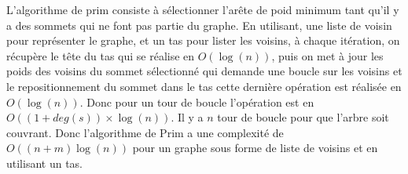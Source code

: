 L'algorithme de prim consiste à sélectionner l'arête de poid minimum tant qu'il y a des sommets qui ne font pas partie du graphe. En utilisant, une liste de voisin pour représenter le graphe, et un tas pour lister les voisins, à chaque itération, on récupère le tête du tas qui se réalise en $O(\log(n))$, puis on met à jour les poids des voisins du sommet sélectionné qui demande une boucle sur les voisins et le repositionnement du sommet dans le tas cette dernière opération est réalisée en $O(\log(n))$. Donc pour un tour de boucle l'opération est en $O((1 + deg(s))\times\log(n))$. Il y a $n$ tour de boucle pour que l'arbre soit couvrant. Donc l'algorithme de Prim a une complexité de $O((n+m) \log(n))$ pour un graphe sous forme de liste de voisins et en utilisant un tas.